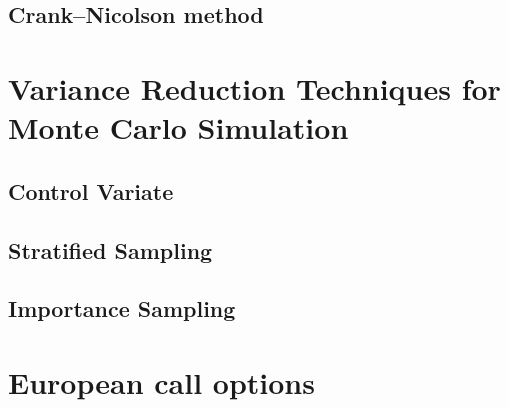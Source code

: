 \subsection{Crank–Nicolson method}
\newpage

\section{Variance Reduction Techniques for Monte Carlo Simulation}

\subsection{Control Variate}
\newpage
\subsection{Stratified Sampling}
\newpage
\subsection{Importance Sampling}
\newpage

\section{European call options}
